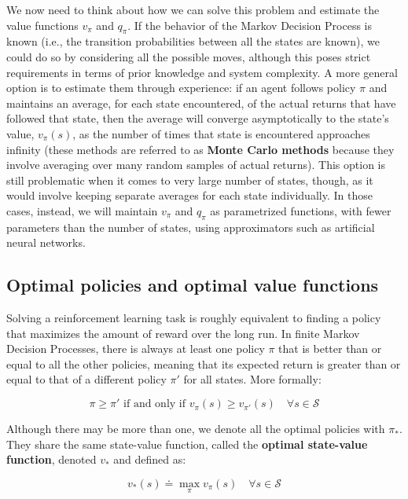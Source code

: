 We now need to think about how we can solve this problem and estimate the value functions $v_\pi$ and $q_\pi$. If the behavior of the Markov Decision Process is known (i.e., the transition probabilities between all the states are known), we could do so by considering all the possible moves, although this poses strict requirements in terms of prior knowledge and system complexity. A more general option is to estimate them through experience: if an agent follows policy $\pi$ and maintains an average, for each state encountered, of the actual returns that have followed that state, then the average will converge asymptotically to the state’s value, $v_\pi(s)$, as the number of times that state is encountered approaches infinity (these methods are referred to as \textbf{Monte Carlo methods} because they involve averaging over many random samples of actual returns). This option is still problematic when it comes to very large number of states, though, as it would involve keeping separate averages for each state individually. In those cases, instead, we will maintain $v_\pi$ and $q_\pi$ as parametrized functions, with fewer parameters than the number of states, using approximators such as artificial neural networks.

\subsection{Optimal policies and optimal value functions}
Solving a reinforcement learning task is roughly equivalent to finding a policy that maximizes the amount of reward over the long run. In finite Markov Decision Processes, there is always at least one policy $\pi$ that is better than or equal to all the other policies, meaning that its expected return is greater than or equal to that of a different policy $\pi'$ for all states. More formally:

\begin{equation*}
    \pi \ge \pi' \text{ if and only if } v_\pi(s) \ge v_{\pi'} (s) \quad \forall s \in \mathcal{S}
\end{equation*}

Although there may be more than one, we denote all the optimal policies with $\pi_*$. They share the same state-value function, called the \textbf{optimal state-value function}, denoted $v_*$ and defined as:

\begin{equation}
    v_*(s) \doteq \max_\pi v_\pi(s) \quad \forall s \in \mathcal{S}
    \label{eq:ch2-optimalstatevaluefunction}
\end{equation}

